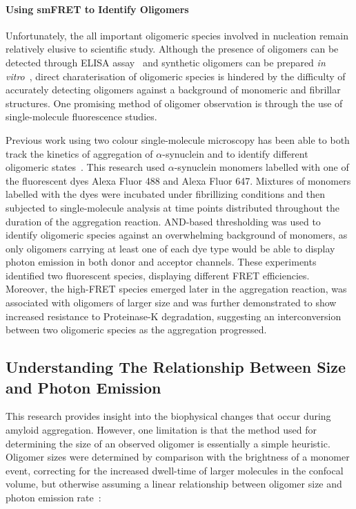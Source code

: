 \paragraph{Using smFRET to Identify Oligomers}
Unfortunately, the all important oligomeric species involved in nucleation remain relatively elusive to scientific study. Although the presence of oligomers can be detected through ELISA assay~\cite{Schmidt2005} and synthetic oligomers can be prepared {\emph{in vitro}}~\cite{Lashuel2002, Murray2003}, direct charaterisation of oligomeric species is hindered by the difficulty of accurately detecting oligomers against a background of monomeric and fibrillar structures. One promising method of oligomer observation is through the use of single-molecule fluorescence studies.

Previous work using two colour single-molecule microscopy has been able to both track the kinetics of aggregation of $\alpha$-synuclein and to identify different oligomeric states~\cite{orte08, cremades2012}. This research used $\alpha$-synuclein monomers labelled with one of the fluorescent dyes Alexa Fluor 488 and Alexa Fluor 647. Mixtures of monomers labelled with the dyes were incubated under fibrillizing conditions and then subjected to single-molecule analysis at time points distributed throughout the duration of the aggregation reaction. AND-based thresholding was used to identify oligomeric species against an overwhelming background of monomers, as only oligomers carrying at least one of each dye type would be able to display photon emission in both donor and acceptor channels. These experiments identified two fluorescent species, displaying different FRET efficiencies. Moreover, the high-FRET species emerged later in the aggregation reaction, was associated with oligomers of larger size and was further demonstrated to show increased resistance to Proteinase-K degradation, suggesting an interconversion between two oligomeric species as the aggregation progressed.

\subsection{Understanding The Relationship Between Size and Photon Emission}


This research provides insight into the biophysical changes that occur during amyloid aggregation. However, one limitation is that the method used for determining the size of an observed oligomer is essentially a simple heuristic. Oligomer sizes were determined by comparison with the brightness of a monomer event, correcting for the increased dwell-time of larger molecules in the confocal volume, but otherwise assuming a linear relationship between oligomer size and photon emission rate~\cite{orte08}:


